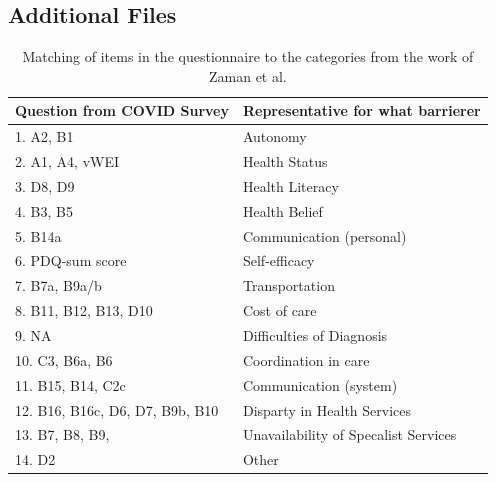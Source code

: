 \documentclass{bmcart}
\begin{document}
\begin{backmatter}
\section*{Additional Files}
\begin{table}[!ht]
    \centering
    \begin{tabular}{l l}
    \toprule
        \textbf{Question from COVID Survey}	& \textbf{Representative for what barrierer} \\
	\midrule
        1. A2, B1 							& Autonomy \\ \hline
        2. A1, A4, vWEI 					& Health Status \\ \hline
        3. D8, D9 							& Health Literacy \\ \hline
        4. B3, B5 							& Health Belief \\ \hline
        5. B14a 							& Communication (personal) \\ \hline
        6. PDQ-sum score 					& Self-efficacy \\ \hline
        7. B7a, B9a/b 						& Transportation \\ \hline
        8. B11, B12, B13, D10 				& Cost of care \\ \hline
        9. NA 							& Difficulties of Diagnosis \\ \hline
        10. C3, B6a, B6 					& Coordination in care \\ \hline
        11. B15, B14, C2c 					& Communication (system) \\ \hline
        12. B16, B16c, D6, D7, B9b, B10 		& Disparty in Health Services \\ \hline
        13. B7, B8, B9, 						& Unavailability of Specalist Services \\ \hline
        14. D2 							& Other \\
        \bottomrule
    \end{tabular}
\caption{Matching of items in the questionnaire to the categories from the work of Zaman et al. \cite{zaman2021barriers}}
\end{table}


\end{backmatter}
\end{document}

